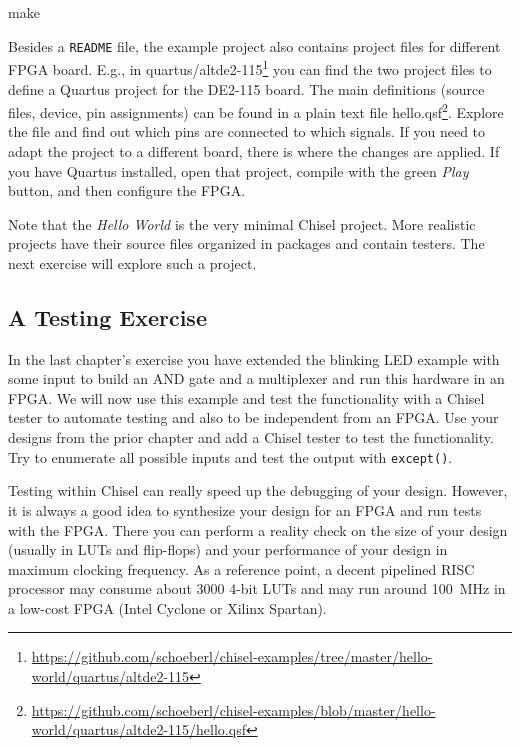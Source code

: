 \documentclass[%
    10pt,
    headinclude, footexclude,
    openright, %
    notitlepage,
    cleardoubleempty,
    headsepline,
    pointlessnumbers,
    bibtotoc, idxtotoc,
    ]{scrbook}
\newcommand{\code}[1]{{\small{\texttt{#1}}}}
\newcommand{\myref}[2]{\href{#1}{#2}}
\renewcommand{\myref}[2]{{#2}{\footnote{\url{#1}}}}
\begin{document}
\begin{chisel}
make
\end{chisel}

Besides a \code{README} file, the example project also contains project
files for different FPGA board. E.g., in
\myref{https://github.com/schoeberl/chisel-examples/tree/master/hello-world/quartus/altde2-115}{quartus/altde2-115} 
you can find the two project files to define a Quartus project for the DE2-115 board.
The main definitions (source files, device, pin assignments) can be found in a plain text file
\myref{https://github.com/schoeberl/chisel-examples/blob/master/hello-world/quartus/altde2-115/hello.qsf}{hello.qsf}.
Explore the file and find out which pins are connected to which signals.
If you need to adapt the project to a different board, there is where the changes are applied.
If you have Quartus installed, open that project, compile with the green \emph{Play} button,
and then configure the FPGA.

Note that the \emph{Hello World} is the very minimal Chisel project.
More realistic projects have their source files organized in packages and contain testers.
The next exercise will explore such a project.

\subsection{A Testing Exercise}

In the last chapter's exercise you have extended the blinking LED example with some input
to build an AND gate and a multiplexer and run this hardware in an FPGA.
We will now use this example and test the functionality with a Chisel tester
to automate testing and also to be independent from an FPGA.
Use your designs from the prior chapter and add a Chisel tester to test the functionality.
Try to enumerate all possible inputs and test the output with \code{except()}.

Testing within Chisel can really speed up the debugging of your design.
However, it is always a good idea to synthesize your design for an FPGA and run tests
with the FPGA. There you can perform a reality check on the size of your design (usually
in LUTs and flip-flops) and your performance of your design in maximum clocking frequency.
As a reference point, a decent pipelined RISC processor may consume about 3000
4-bit LUTs and may run around 100~MHz in a low-cost FPGA (Intel Cyclone or
Xilinx Spartan).
\end{document}
